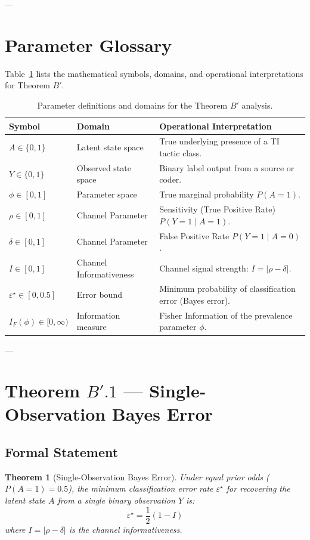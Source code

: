 \documentclass[11pt,a4paper]{article}
\newtheorem{theorem}{Theorem}
\begin{document}
---

\section{Parameter Glossary}
Table~\ref{tab:parameters} lists the mathematical symbols, domains, and operational interpretations for Theorem $B'$.

\begin{table}[h]
\centering
\caption{Parameter definitions and domains for the Theorem $B'$ analysis.}
\label{tab:parameters}
\begin{tabularx}{\textwidth}{llX}
\toprule
\textbf{Symbol} & \textbf{Domain} & \textbf{Operational Interpretation} \\
\midrule
$A \in \{0, 1\}$ & Latent state space & True underlying presence of a TI tactic class. \\
$Y \in \{0, 1\}$ & Observed state space & Binary label output from a source or coder. \\
$\phi \in [0, 1]$ & Parameter space & True marginal probability $P(A = 1)$. \\
$\rho \in [0, 1]$ & Channel Parameter & Sensitivity (True Positive Rate) $P(Y = 1 \mid A = 1)$. \\
$\delta \in [0, 1]$ & Channel Parameter & False Positive Rate $P(Y = 1 \mid A = 0)$. \\
$I \in [0, 1]$ & Channel Informativeness & Channel signal strength: $I = |\rho - \delta|$. \\
$\varepsilon^\star \in [0, 0.5]$ & Error bound & Minimum probability of classification error (Bayes error). \\
$I_F(\phi) \in [0, \infty)$ & Information measure & Fisher Information of the prevalence parameter $\phi$. \\
\bottomrule
\end{tabularx}
\end{table}

---

\section{Theorem $B'.1$ --- Single-Observation Bayes Error}

\subsection{Formal Statement}
\begin{theorem}[Single-Observation Bayes Error]
Under equal prior odds ($P(A=1) = 0.5$), the minimum classification error rate $\varepsilon^\star$ for recovering the latent state $A$ from a single binary observation $Y$ is:
\begin{equation}\label{eq:bayes_error_bound}
\varepsilon^\star = \frac{1}{2}(1 - I)
\end{equation}
where $I = |\rho - \delta|$ is the channel informativeness.
\end{theorem}
\end{document}
